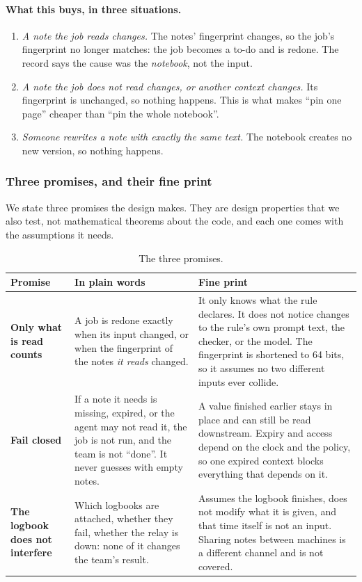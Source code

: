 \documentclass[10pt,a4paper]{article}
\begin{document}
\paragraph{What this buys, in three situations.}

\begin{enumerate}[leftmargin=*]
\item \emph{A note the job reads changes.} The notes' fingerprint changes, so the job's fingerprint no longer
      matches: the job becomes a to-do and is redone. The record says the cause was the \emph{notebook}, not the
      input.
\item \emph{A note the job does \emph{not} read changes, or another context changes.} Its fingerprint is
      unchanged, so nothing happens. This is what makes ``pin one page'' cheaper than ``pin the whole
      notebook''.
\item \emph{Someone rewrites a note with exactly the same text.} The notebook creates no new version, so
      nothing happens.
\end{enumerate}

\subsubsection*{Three promises, and their fine print}

We state three promises the design makes. They are design properties that we also test, not mathematical
theorems about the code, and each one comes with the assumptions it needs.

\begin{table}[h]
\centering\small
\caption{The three promises.}
\label{tab:promises}
\begin{tabularx}{\textwidth}{@{}l X X@{}}
\toprule
Promise & In plain words & Fine print \\
\midrule
\textbf{Only what is read counts} & A job is redone exactly when its input changed, or when the fingerprint of the notes
  \emph{it reads} changed. & It only knows what the rule declares. It does not notice changes to the rule's own
  prompt text, the checker, or the model. The fingerprint is shortened to 64 bits, so it assumes no two different
  inputs ever collide. \\[3pt]
\textbf{Fail closed} & If a note it needs is missing, expired, or the agent may not read it, the job is not run,
  and the team is not ``done''. It never guesses with empty notes. & A value finished earlier stays in place and can
  still be read downstream. Expiry and access depend on the clock and the policy, so one expired context blocks
  everything that depends on it. \\[3pt]
\textbf{The logbook does not interfere} & Which logbooks are attached, whether they fail, whether the relay is
  down: none of it changes the team's result. & Assumes the logbook finishes, does not modify what it is given, and
  that time itself is not an input. Sharing notes between machines is a different channel and is not covered. \\
\bottomrule
\end{tabularx}
\end{table}
\end{document}
